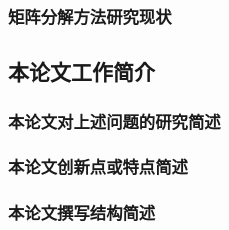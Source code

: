         \subsubsection{矩阵分解方法研究现状}




    \subsection{本论文工作简介}
        \subsubsection{本论文对上述问题的研究简述}




        \subsubsection{本论文创新点或特点简述}




        \subsubsection{本论文撰写结构简述}

